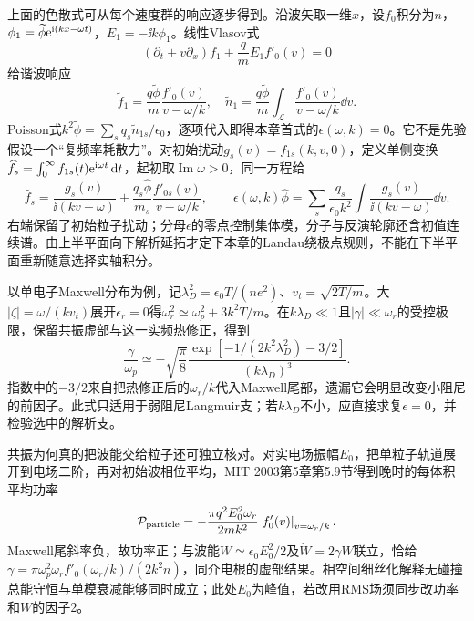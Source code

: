 上面的色散式可从每个速度群的响应逐步得到。沿波矢取一维$x$，设$f_0$积分为$n$，$\phi_1=\widetilde\phi\mathrm e^{\mathrm i(kx-\omega t)}$，$E_1=-\ii k\phi_1$。线性Vlasov式
\begin{equation}
(\partial_t+v\partial_x)f_1+\frac qm E_1 f'_0(v)=0
\end{equation}
给谐波响应
\begin{equation}
\widetilde f_1=\frac{q\widetilde\phi}{m}\frac{f'_0(v)}{v-\omega/k},
\quad \widetilde n_1=\frac{q\widetilde\phi}{m}
\int_{\mathcal L}\frac{f'_0(v)}{v-\omega/k}\dd v .
\end{equation}
Poisson式$k^2\widetilde\phi=\sum_s q_s\widetilde n_{1s}/\epsilon_0$，逐项代入即得本章首式的$\epsilon(\omega,k)=0$。它不是先验假设一个“复频率耗散力”。对初始扰动$g_s(v)=f_{1s}(k,v,0)$，定义单侧变换$\widehat f_s=\int_0^\infty f_{1s}(t)\mathrm e^{\mathrm i\omega t}\,\mathrm d t$，起初取$\operatorname{Im}\omega>0$，同一方程给
\begin{equation}
\widehat f_s=\frac{g_s(v)}{\ii(kv-\omega)}
+\frac{q_s\widehat\phi}{m_s}\frac{f'_{0s}(v)}{v-\omega/k},\qquad
\epsilon(\omega,k)\widehat\phi=
\sum_s\frac{q_s}{\epsilon_0k^2}\int
\frac{g_s(v)}{\ii(kv-\omega)}\dd v .
\end{equation}
右端保留了初始粒子扰动；分母$\epsilon$的零点控制集体模，分子与反演轮廓还含初值连续谱。由上半平面向下解析延拓才定下本章的Landau绕极点规则，不能在下半平面重新随意选择实轴积分。

以单电子Maxwell分布为例，记$\lambda_D^2=\epsilon_0T/(ne^2)$、$v_t=\sqrt{2T/m}$。大$|\zeta|=\omega/(kv_t)$展开$\epsilon_r=0$得$\omega_r^2\simeq\omega_p^2+3k^2T/m$。在$k\lambda_D\ll1$且$|\gamma|\ll\omega_r$的受控极限，保留共振虚部与这一实频热修正，得到
\begin{equation}
\frac{\gamma}{\omega_p}\simeq
-\sqrt{\frac{\pi}{8}}\frac{\exp[-1/(2k^2\lambda_D^2)-3/2]}
{(k\lambda_D)^3}.
\end{equation}
指数中的$-3/2$来自把热修正后的$\omega_r/k$代入Maxwell尾部，遗漏它会明显改变小阻尼的前因子。此式只适用于弱阻尼Langmuir支；若$k\lambda_D$不小，应直接求复$\epsilon=0$，并检验选中的解析支。

共振为何真的把波能交给粒子还可独立核对。对实电场振幅$E_0$，把单粒子轨道展开到电场二阶，再对初始波相位平均，MIT 2003第5章第5.9节得到晚时的每体积平均功率
\begin{equation}
\mathcal P_{\rm particle}
=-\frac{\pi q^2E_0^2\omega_r}{2mk^2}
\left.f'_0(v)\right|_{v=\omega_r/k}.
\end{equation}
Maxwell尾斜率负，故功率正；与波能$W\simeq\epsilon_0E_0^2/2$及$\dot W=2\gamma W$联立，恰给
$\gamma=\pi\omega_p^2\omega_r f'_0(\omega_r/k)/(2k^2n)$，同介电根的虚部结果。相空间细丝化解释无碰撞总能守恒与单模衰减能够同时成立；此处$E_0$为峰值，若改用RMS场须同步改功率和$W$的因子2。

